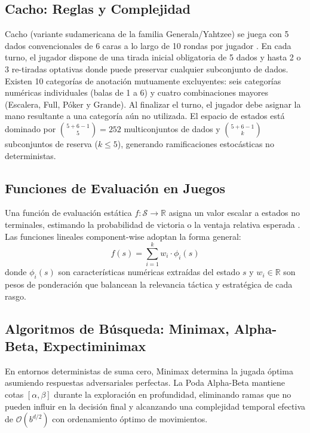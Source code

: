 \documentclass[10pt, a4paper]{article}
\begin{document}
\subsection{Cacho: Reglas y Complejidad}
Cacho (variante sudamericana de la familia Generala/Yahtzee) se juega con 5 dados convencionales de 6 caras a lo largo de 10 rondas por jugador \cite{glenn2006yahtzee, verhoeff1999yahtzee}. En cada turno, el jugador dispone de una tirada inicial obligatoria de 5 dados y hasta 2 o 3 re-tiradas optativas donde puede preservar cualquier subconjunto de dados. Existen 10 categorías de anotación mutuamente excluyentes: seis categorías numéricas individuales (balas de 1 a 6) y cuatro combinaciones mayores (Escalera, Full, Póker y Grande). Al finalizar el turno, el jugador debe asignar la mano resultante a una categoría aún no utilizada. El espacio de estados está dominado por $\binom{5+6-1}{5} = 252$ multiconjuntos de dados y $\binom{5+6-1}{k}$ subconjuntos de reserva ($k \le 5$), generando ramificaciones estocásticas no deterministas.

\subsection{Funciones de Evaluación en Juegos}
Una función de evaluación estática $f: \mathcal{S} \to \mathbb{R}$ asigna un valor escalar a estados no terminales, estimando la probabilidad de victoria o la ventaja relativa esperada \cite{russellnorvig2020}. Las funciones lineales component-wise adoptan la forma general:
\begin{equation}
f(s) = \sum_{i=1}^k w_i \cdot \phi_i(s)
\label{eq:lineal_general}
\end{equation}
donde $\phi_i(s)$ son características numéricas extraídas del estado $s$ y $w_i \in \mathbb{R}$ son pesos de ponderación que balancean la relevancia táctica y estratégica de cada rasgo.

\subsection{Algoritmos de Búsqueda: Minimax, Alpha-Beta, Expectiminimax}
En entornos deterministas de suma cero, Minimax determina la jugada óptima asumiendo respuestas adversariales perfectas. La Poda Alpha-Beta mantiene cotas $[\alpha, \beta]$ durante la exploración en profundidad, eliminando ramas que no pueden influir en la decisión final y alcanzando una complejidad temporal efectiva de $\mathcal{O}(b^{d/2})$ con ordenamiento óptimo de movimientos.
\end{document}
